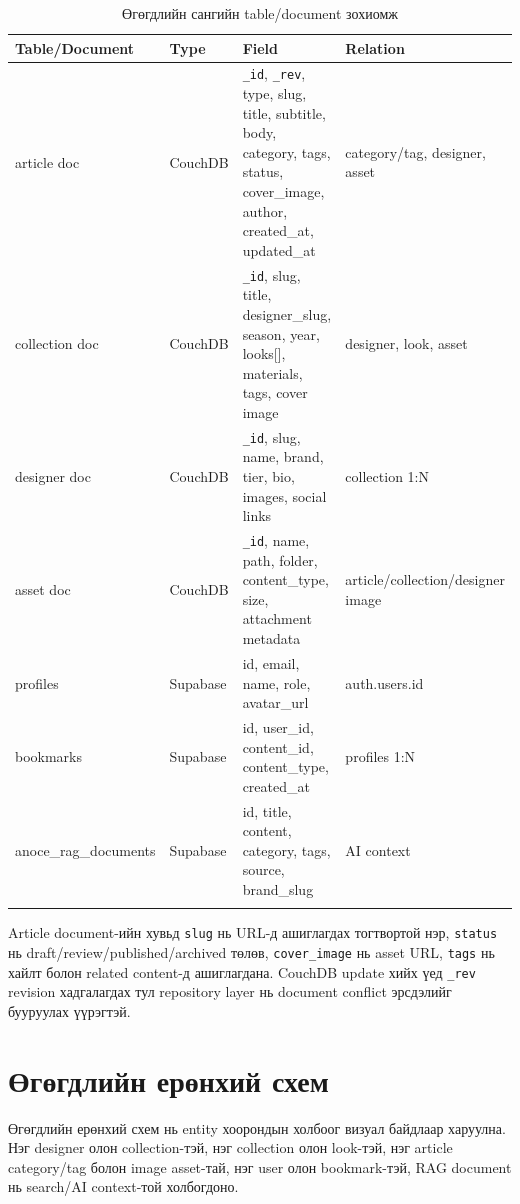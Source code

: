 {\small
\begin{longtable}{|L{0.18\textwidth}|L{0.16\textwidth}|L{0.36\textwidth}|L{0.18\textwidth}|}
  \hline
  \textbf{Table/Document} & \textbf{Type} & \textbf{Field} & \textbf{Relation} \\ \hline
  article doc & CouchDB & \texttt{\_id}, \texttt{\_rev}, type, slug, title, subtitle, body, category, tags, status, cover\_image, author, created\_at, updated\_at & category/tag, designer, asset \\ \hline
  collection doc & CouchDB & \texttt{\_id}, slug, title, designer\_slug, season, year, looks[], materials, tags, cover image & designer, look, asset \\ \hline
  designer doc & CouchDB & \texttt{\_id}, slug, name, brand, tier, bio, images, social links & collection 1:N \\ \hline
  asset doc & CouchDB & \texttt{\_id}, name, path, folder, content\_type, size, attachment metadata & article/collection/designer image \\ \hline
  profiles & Supabase & id, email, name, role, avatar\_url & auth.users.id \\ \hline
  bookmarks & Supabase & id, user\_id, content\_id, content\_type, created\_at & profiles 1:N \\ \hline
  anoce\_rag\_documents & Supabase & id, title, content, category, tags, source, brand\_slug & AI context \\ \hline
  \caption{Өгөгдлийн сангийн table/document зохиомж}
  \label{tab:ch3-database-design}\\
\end{longtable}
}

Article document-ийн хувьд \texttt{slug} нь URL-д ашиглагдах тогтвортой нэр, \texttt{status} нь draft/review/published/archived төлөв, \texttt{cover\_image} нь asset URL, \texttt{tags} нь хайлт болон related content-д ашиглагдана. CouchDB update хийх үед \texttt{\_rev} revision хадгалагдах тул repository layer нь document conflict эрсдэлийг бууруулах үүрэгтэй.

\section{Өгөгдлийн ерөнхий схем}
Өгөгдлийн ерөнхий схем нь entity хоорондын холбоог визуал байдлаар харуулна. Нэг designer олон collection-тэй, нэг collection олон look-тэй, нэг article category/tag болон image asset-тай, нэг user олон bookmark-тэй, RAG document нь search/AI context-той холбогдоно.

